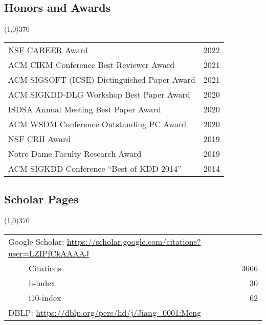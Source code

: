 \documentclass[10pt]{article}
\begin{document}
\vspace{-0.6cm}
\subsection{\sc Honors and Awards}
\vspace{-0.4cm} \line(1,0){370} \vspace{-0.1cm}

\begin{table}[h!]
\begin{tabular*}{12.7cm}{p{11.65cm}r}
NSF CAREER Award & 2022 \\
ACM CIKM Conference Best Reviewer Award & 2021 \\	
ACM SIGSOFT (ICSE) Distinguished Paper Award & 2021 \\
ACM SIGKDD-DLG Workshop Best Paper Award & 2020 \\
ISDSA Annual Meeting Best Paper Award & 2020 \\
ACM WSDM Conference Outstanding PC Award & 2020 \\
NSF CRII Award & 2019 \\
Notre Dame Faculty Research Award & 2019 \\
ACM SIGKDD Conference ``Best of KDD 2014'' & 2014 \\
\end{tabular*}
\end{table}

\vspace{-0.6cm}
\subsection{\sc Scholar Pages}
\vspace{-0.4cm} \line(1,0){370} \vspace{-0.1cm}

\begin{table}[h!]
\begin{tabular*}{12.7cm}{p{11.65cm}r}
\multicolumn{2}{l}{Google Scholar: \url{https://scholar.google.com/citations?user=LZIPfCkAAAAJ}} \\
~~~~~Citations & 3666 \\
~~~~~h-index & 30 \\
~~~~~i10-index & 62 \\
\multicolumn{2}{l}{DBLP: \url{https://dblp.org/pers/hd/j/Jiang\_0001:Meng}} \\
\end{tabular*}
\end{table}
\end{document}
